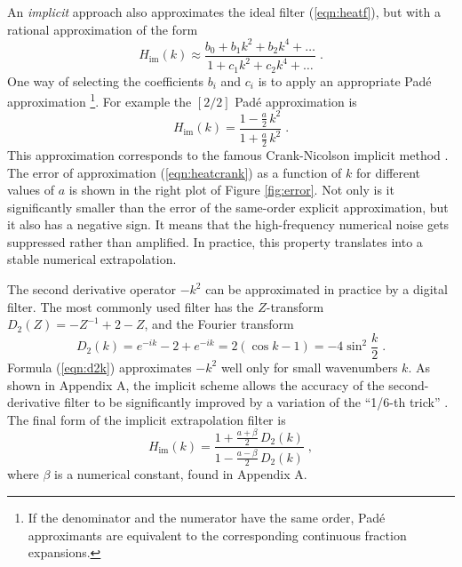 \par
An \emph{implicit} approach also approximates the ideal filter
(\ref{eqn:heatf}), but with a rational approximation of the form
\begin{equation}
  \label{eqn:heatpade}
  H_{\mbox{im}} (k) \approx \frac{b_0 + b_1 k^2 + b_2 k^4 + \ldots}
  {1 + c_1 k^2 + c_2 k^4 + \ldots}
\;.
\end{equation}
One way of selecting the coefficients $b_i$ and $c_i$ is to apply an
appropriate Pad\'{e} approximation \cite{pade}\footnote{If the
  denominator and the numerator have the same order, Pad\'{e}
  approximants are equivalent to the corresponding continuous
  fraction expansions.}.  For example the $[2/2]$ Pad\'{e}
approximation is
\begin{equation}
  \label{eqn:heatcrank}
  H_{\mbox{im}} (k) =
  \frac{1 - \frac{a}{2}\,k^2}{1 + \frac{a}{2}\,k^2}
  \;.
\end{equation}
This approximation corresponds to the famous Crank-Nicolson implicit
method \cite{cn}. The error of approximation (\ref{eqn:heatcrank}) as
a function of $k$ for different values of $a$ is shown in the right
plot of Figure \ref{fig:error}. Not only is it significantly smaller
than the error of the same-order explicit approximation, but it also
has a negative sign. It means that the high-frequency numerical noise
gets suppressed rather than amplified. In practice, this property
translates into a stable numerical extrapolation.
\par
The second derivative operator $-k^2$ can be approximated in practice
by a digital filter. The most commonly used filter has the
$Z$-transform $D_2 (Z) = -Z^{-1} + 2 - Z$, and the Fourier transform
\begin{equation}
  \label{eqn:d2k}
  D_2 (k) = e^{-ik} - 2 + e^{-ik} = 2 (\cos{k} - 1) = -4
  \sin^2{\frac{k}{2}}\;.
\end{equation}
Formula (\ref{eqn:d2k}) approximates $-k^2$ well only for small
wavenumbers $k$. As shown in Appendix A, the implicit scheme allows
the accuracy of the second-derivative filter to be significantly
improved by a variation of the ``1/6-th trick''
\cite{Claerbout.blackwell.85}. The final form of the implicit
extrapolation filter is
\begin{equation}
  \label{eqn:heatfk}
   H_{\mbox{im}} (k) =
   \frac{1 + \frac{a+\beta}{2}\,D_2 (k)}{1 - \frac{a-\beta}{2}\,D_2 (k)}
   \;,
\end{equation}
where $\beta$ is a numerical constant, found in Appendix A.

